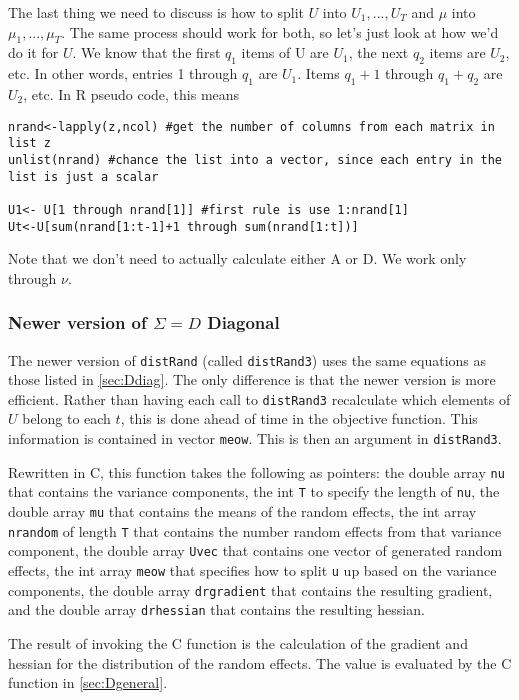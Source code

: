 \documentclass{article}
\begin{document}
The last thing we need to discuss is how to split $U$ into $U_1,...,U_T$ and $\mu$ into $\mu_1,...,\mu_T$. The same process should work for both, so let's just look at how we'd do it for $U$.  We know that the first $q_1$ items of U are $U_1$, the next $q_2$ items are $U_2$, etc.  In other words, entries 1 through $q_1$ are $U_1$. Items $q_1+1$ through $q_1+q_2$ are $U_2$, etc. In R pseudo code, this means 
\begin{verbatim}
nrand<-lapply(z,ncol) #get the number of columns from each matrix in list z
unlist(nrand) #chance the list into a vector, since each entry in the list is just a scalar

U1<- U[1 through nrand[1]] #first rule is use 1:nrand[1]
Ut<-U[sum(nrand[1:t-1]+1 through sum(nrand[1:t])]
\end{verbatim} 

Note that we don't need to actually calculate either A or D. We work only through $\nu$.

\subsubsection{Newer version of $\Sigma=D$ Diagonal}
The newer version of \texttt{distRand} (called \texttt{distRand3}) uses the same equations as those listed in \ref{sec:Ddiag}. The only difference is that the newer version is more efficient. Rather than having each call to \texttt{distRand3} recalculate which elements of $U$ belong to each $t$, this is done ahead of time in the objective function. This information is contained in vector \texttt{meow}. This is then an argument in \texttt{distRand3}.

Rewritten in C, this function takes the following as pointers: the double array \texttt{nu} that contains the variance components, the int \texttt{T} to specify the length of \texttt{nu}, the double array \texttt{mu} that contains the means of the random effects, the int array \texttt{nrandom} of length \texttt{T} that contains the number random effects from that variance component, the double array \texttt{Uvec} that contains one vector of generated random effects,  the int array \texttt{meow} that specifies how to split \texttt{u} up based on the variance components, the double array \texttt{drgradient} that  contains the resulting gradient, and the double array \texttt{drhessian} that  contains the resulting hessian.

The result of invoking the C function is  the calculation of the gradient and hessian for the distribution of the random effects. The value is  evaluated by the C function in \ref{sec:Dgeneral}.
\end{document}
